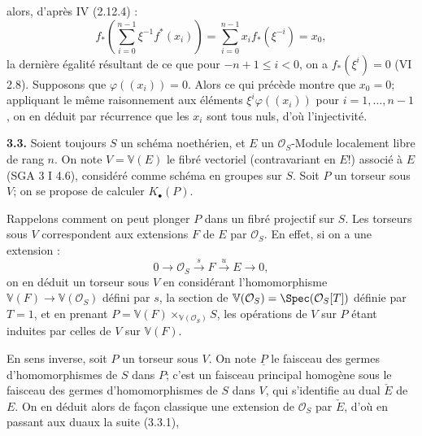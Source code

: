 alors, d'après IV (2.12.4) :
\[
f_*\left(\sum_{i=0}^{n-1}\xi^{-1}f^*(x_i)\right)
=\sum_{i=0}^{n-1}x_i f_*(\xi^{-i})=x_0,
\]
la dernière égalité résultant de ce que pour $-n+1\le i<0$, on a $f_*(\xi^i)=0$ (VI 2.8). Supposons que $\varphi((x_i))=0$. Alors ce qui précède montre que $x_0=0$; appliquant le même raisonnement aux éléments $\xi^i\varphi((x_i))$ pour $i=1,\ldots,n-1$, on en déduit par récurrence que les $x_i$ sont tous nuls, d'où l'injectivité.

\textbf{3.3.} Soient toujours $S$ un schéma noethérien, et $E$ un $\mathcal O_S$-Module localement libre de rang $n$. On note $V=\mathbb V(E)$ le fibré vectoriel (contravariant en $E$!) associé à $E$ (SGA 3 I 4.6), considéré comme schéma en groupes sur $S$. Soit $P$ un torseur sous $V$; on se propose de calculer $K_\bullet(P)$.

Rappelons comment on peut plonger $P$ dans un fibré projectif sur $S$. Les torseurs sous $V$ correspondent aux extensions $F$ de $E$ par $\mathcal O_S$. En effet, si on a une extension :
\[
0\longrightarrow \mathcal O_S\xrightarrow{s}F\xrightarrow{u}E\longrightarrow 0,
\tag{3.3.1}
\]
on en déduit un torseur sous $V$ en considérant l'homomorphisme $\mathbb V(F)\to \mathbb V(\mathcal O_S)$ défini par $s$, la section de $\mathbb V(\mathcal O_S)=\Spec(\mathcal O_S[T])$ définie par $T=1$, et en prenant $P=\mathbb V(F)\times_{\mathbb V(\mathcal O_S)}S$, les opérations de $V$ sur $P$ étant induites par celles de $V$ sur $\mathbb V(F)$.

En sens inverse, soit $P$ un torseur sous $V$. On note $\underline P$ le faisceau des germes d'homomorphismes de $S$ dans $P$; c'est un faisceau principal homogène sous le faisceau des germes d'homomorphismes de $S$ dans $V$, qui s'identifie au dual $\check E$ de $E$. On en déduit alors de façon classique une extension de $\mathcal O_S$ par $\check E$, d'où en passant aux duaux la suite (3.3.1),

